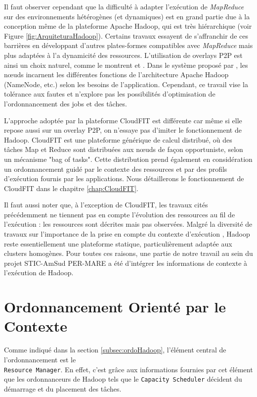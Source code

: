 Il faut observer cependant que la difficulté à adapter l'exécution de \textit{MapReduce} sur des environnements hétérogènes (et dynamiques) est en grand partie due à la conception même de la plateforme Apache Hadoop, qui est très hiérarchique (voir Figure \ref{fig:ArquiteturaHadoop}). Certains travaux essayent de s'affranchir de ces barrières en développant d'autres plates-formes compatibles avec \textit{MapReduce} mais plus adaptées à l'a dynamicité des ressources.  L'utilisation de overlays P2P est ainsi un choix naturel, comme le montrent \cite{Marozzo2012} et \cite{Steffenel20151034}. Dans le système proposé par \cite{Marozzo2012}, les n{\oe}uds incarnent les différentes fonctions de l'architecture Apache Hadoop (NameNode, etc.) selon les besoins de l'application. Cependant, ce travail vise la tolérance aux fautes et n'explore pas les possibilités d'optimisation de l'ordonnancement des jobs et des tâches. 

L'approche adoptée par la plateforme CloudFIT \cite{Steffenel20151034} est différente car même si elle repose aussi sur un overlay P2P, on n'essaye pas d'imiter le fonctionnement de Hadoop. CloudFIT est une plateforme générique de calcul distribué, où des tâches Map et Reduce sont distribuées aux n{\oe}uds de façon opportuniste, selon un mécanisme "bag of tasks". Cette distribution prend également en considération un ordonnancement guidé par le contexte des ressources et par des profils d'exécution fournis par les applications. Nous détaillerons le fonctionnement de CloudFIT dans le chapitre \ref{chap:CloudFIT}.

Il faut aussi noter que, à l'exception de CloudFIT, les travaux cités précédemment ne tiennent pas en compte l'évolution des ressources au fil de l'exécution : les ressources sont décrites mais pas observées. Malgré la diversité de travaux sur l'importance de la prise en compte du contexte d'exécution \cite{Baldauf, Maamar, Ramakrishnan2014, Najar2015}, Hadoop reste essentiellement une plateforme statique, particulièrement adaptée aux clusters homogènes. Pour toutes ces raisons, une partie de notre travail au sein du projet STIC-AmSud PER-MARE a été d'intégrer les informations de contexte à l'exécution de Hadoop.

\section{Ordonnancement Orienté par le Contexte} \label{sec:desenv}

Comme indiqué dans la section \ref{subsec:ordoHadoop}, l'élément central de l'ordonnancement est le \\\texttt{Resource Manager}. En effet, c'est grâce aux informations fournies par cet élément que les ordonnanceurs de Hadoop tels que le \texttt{Capacity Scheduler} décident du démarrage et du placement des tâches. 

